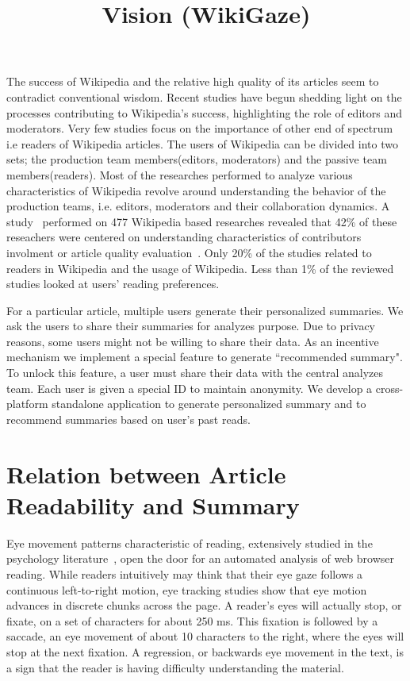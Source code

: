 \documentclass[12pt]{article}
\begin{document}
\title{Vision (WikiGaze)}
\maketitle

The success of Wikipedia and the relative high quality of its
articles seem to contradict conventional wisdom. Recent
studies have begun shedding light on the processes
contributing to Wikipedia’s success, highlighting the role of editors and moderators. Very few studies focus on the importance of other end of spectrum i.e readers of Wikipedia articles. \cite{Beymer:2005:WSC:1056808.1057055}
The users of Wikipedia can be divided into two sets; the production team members(editors, moderators) and the passive team members(readers). Most of the researches performed to analyze various characteristics of Wikipedia revolve around understanding the behavior of the production teams, i.e. editors, moderators and their collaboration dynamics. A study~\cite{okoli2012people} performed on 477 Wikipedia based researches revealed that 42\% of these reseachers were centered on understanding characteristics of contributors involment or article quality evaluation~\cite{wilkinson2007assessing, kittur2008harnessing, stvilia2008information}. Only 20\% of the studies related to readers in Wikipedia and the usage of Wikipedia. Less than 1\% of the reviewed studies looked at users' reading preferences.

For a particular article, multiple users generate their personalized summaries. We ask the users to share their summaries for analyzes purpose.  Due to privacy reasons, some users might not be willing to share their data. As an incentive mechanism we implement a special feature to generate ``recommended summary". To unlock this feature, a user must share their data with the central analyzes team. Each user is given a special ID to maintain anonymity. We develop a cross-platform standalone application to generate personalized summary and to recommend summaries based on user's past reads.



\section{Relation between Article Readability and Summary}

Eye movement patterns characteristic of reading, extensively studied in the
psychology literature~\cite{rayner1998eye}, open the door for an automated
analysis of web browser reading. 
While readers intuitively may think that their eye gaze follows a continuous left-to-right motion, eye tracking studies show that eye motion
advances in discrete chunks across the page. 
A reader's eyes will actually stop, or fixate, on a set of characters for
about 250 ms. 
This fixation is followed by a saccade, an eye movement of about 10 characters to the right, where the eyes will stop at the next fixation. 
A regression, or backwards eye movement in the text, is a sign that the
reader is having difficulty understanding the material. 
\end{document}
